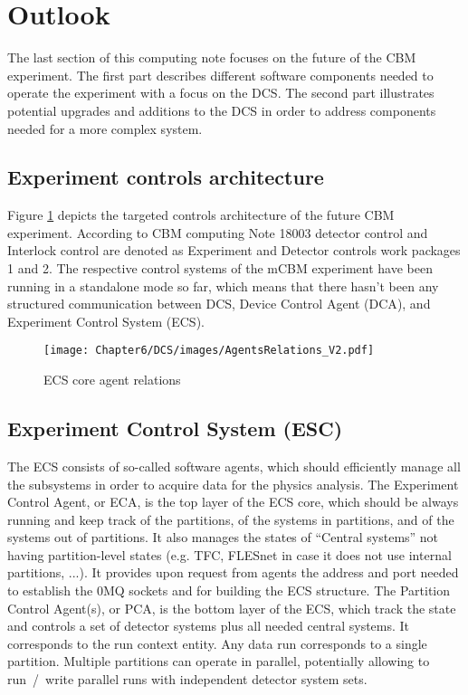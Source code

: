 \newpage
\section{Outlook}
The last section of this computing note focuses on the future of the CBM experiment. The first part describes different software components needed to operate the experiment with a focus on the \gls{DCS}. The second part illustrates potential upgrades and additions to the DCS in order to address components needed for a more complex system.
\subsection{Experiment controls architecture}
Figure \ref{fig_sim} depicts the targeted controls architecture of the future CBM experiment. According to CBM computing Note 18003 \cite{CBM_definitions} detector control and Interlock control are denoted as Experiment and Detector controls work packages 1 and 2. The respective control systems of the mCBM experiment have been running in a standalone mode so far, which means that there hasn't been any structured communication between DCS, Device Control Agent (\gls{DCA}), and Experiment Control System (\gls{ECS}).

\begin{figure}[h!]
\centering
\texttt{[image: Chapter6/DCS/images/AgentsRelations\_V2.pdf]}
\caption{ECS core agent relations}
\label{fig_sim}
\end{figure}

\subsection{Experiment Control System (ESC)}\label{sssAgents}
The ECS consists of so-called software agents, which should efficiently manage all the subsystems in order to acquire data for the physics analysis.
The Experiment Control Agent, or ECA, is the top layer of the ECS core, which should be always running and keep track of 
the partitions, of the systems in partitions, and of the systems out of partitions.  It also manages the states of ``Central systems'' not having partition-level states (e.g. TFC, FLESnet in case it does 
not use internal partitions, ...). It provides upon request from agents the address and port needed to establish the 0MQ sockets and for building the 
ECS structure. The Partition Control Agent(s), or PCA, is the bottom layer of the ECS, which track the state and controls a set of 
detector systems plus all needed central systems. It corresponds to the run context entity.  Any data run corresponds to a single partition. 
Multiple partitions can operate in parallel, potentially allowing to run~/~write parallel runs with independent 
detector system sets. 

